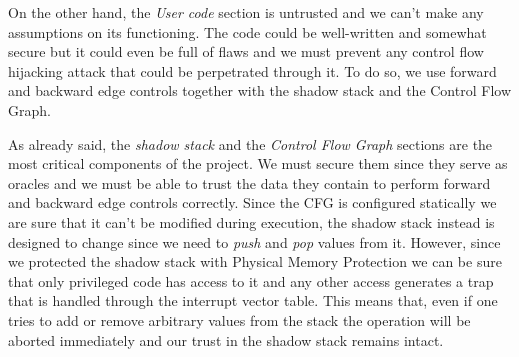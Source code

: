 On the other hand, the \textit{User code} section is untrusted and we can't make
any assumptions on its functioning. The code could be well-written and somewhat secure
but it could even be full of flaws and we must prevent any control flow hijacking
attack that could be perpetrated through it. To do so, we use forward and backward
edge controls together with the shadow stack and the Control Flow Graph.

As already said, the \textit{shadow stack} and the \textit{Control Flow Graph}
sections are the most critical components of the project. We must secure them since
they serve as oracles and we must be able to trust the data they contain to perform
forward and backward edge controls correctly. Since the CFG is configured
statically we are sure that it can't be modified during execution, the shadow stack
instead is designed to change since we need to \textit{push} and \textit{pop} values
from it. However, since we protected the shadow stack with Physical Memory Protection
we can be sure that only privileged code has access to it and any other access generates
a trap that is handled through the interrupt vector table. This means that, even
if one tries to add or remove arbitrary values from the stack the operation will
be aborted immediately and our trust in the shadow stack remains intact.

